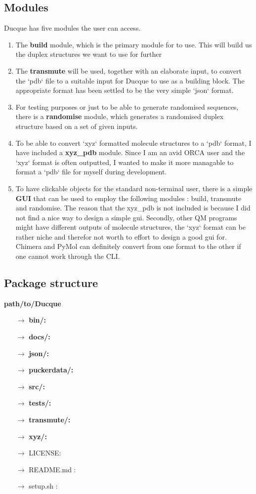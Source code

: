 \subsection{Modules}
Ducque has five modules the user can access.
\begin{enumerate}
    \item The \textbf{build} module, which is the primary module for to use. This will build us the duplex structures
we want to use for further
\item The \textbf{transmute} will be used, together with an elaborate input, to convert the ‘pdb‘ file to a
suitable input for Ducque to use as a building block. The appropriate format has been settled to
be the very simple ‘json‘ format.
\item For testing purposes or just to be able to generate randomised sequences, there is a \textbf{randomise}
module, which generates a randomised duplex structure based on a set of given inputs.
    \item To be able to convert ‘xyz‘ formatted molecule structures to a ‘pdb‘ format, I have included a
        \textbf{xyz\_pdb} module. Since I am an avid ORCA user and the ‘xyz‘ format is often outputted, I
wanted to make it more managable to format a ‘pdb‘ file for myself during development.
\item To have clickable objects for the standard non-terminal user, there is a simple \textbf{GUI} that can be
used to employ the following modules : build, transmute and randomise. The reason that the
xyz\_pdb is not included is because I did not find a nice way to design a simple gui. Secondly,
other QM programs might have different outputs of molecule structures, the ‘xyz‘ format can be
rather niche and therefor not worth to effort to design a good gui for. Chimera and PyMol can
definitely convert from one format to the other if one cannot work through the CLI.
    
\end{enumerate}
\subsection{Package structure}
\textbf{path/to/Ducque}
%
\begin{itemize}[leftmargin=*]
    \setlength{\itemsep}{-1mm}
    \item[$\rightarrow$] \textbf{bin/:}
    \item[$\rightarrow$] \textbf{docs/:}
    \item[$\rightarrow$] \textbf{json/:}
    \item[$\rightarrow$] \textbf{puckerdata/:}
    \item[$\rightarrow$] \textbf{src/:}
    \item[$\rightarrow$] \textbf{tests/:}
    \item[$\rightarrow$] \textbf{transmute/:}
    \item[$\rightarrow$] \textbf{xyz/:}
    \item[$\rightarrow$] LICENSE:
    \item[$\rightarrow$] README.md :
    \item[$\rightarrow$] setup.sh :
\end{itemize}

